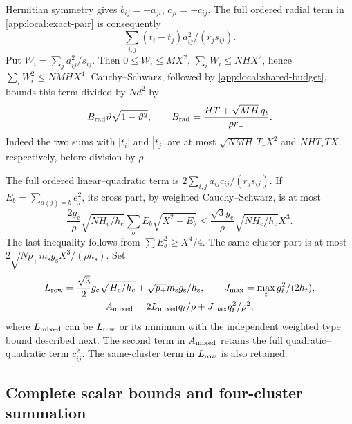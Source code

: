 Hermitian symmetry gives $b_{ij}=-a_{ji}$, $c_{ji}=-c_{ij}$.
The full ordered radial term in \eqref{app:local:exact-pair} is consequently
\[
 \sum_{i,j}(t_i-t_j)a_{ij}^2/(r_js_{ij}).
\]
Put $W_i=\sum_j a_{ij}^2/s_{ij}$. Then $0\le W_i\le MX^2$,
$\sum_iW_i\le NHX^2$, hence $\sum_iW_i^2\le NMHX^4$.
Cauchy--Schwarz, followed by \eqref{app:local:shared-budget}, bounds this
term divided by $Nd^2$ by
\begin{equation}\label{app:local:radial-row}
 B_{\rm rad}\vartheta\sqrt{1-\vartheta^2},\qquad
 B_{\rm rad}=\frac{HT+\sqrt{MH}\,q_t}{\rho r_-}.
\end{equation}
Indeed the two sums with $|t_i|$ and $|t_j|$ are at most
$\sqrt{NMH}\,T_rX^2$ and $NHT_rTX$, respectively, before division by
$\rho$.

The full ordered linear--quadratic term is
$2\sum_{i,j}a_{ij}c_{ij}/(r_js_{ij})$. If
$E_b=\sum_{a(j)=b}e_j^2$, its cross part, by weighted Cauchy--Schwarz,
is at most
\[
 \frac{2g_{\mathrm c}}\rho\sqrt{NH_{\mathrm c}/h_{\mathrm c}}
 \sum_b E_b\sqrt{X^2-E_b}
 \le\frac{\sqrt3g_{\mathrm c}}\rho
        \sqrt{NH_{\mathrm c}/h_{\mathrm c}}X^3.
\]
The last inequality follows from
$\sum E_b^2\ge X^4/4$. The same-cluster part is at most
$2\sqrt{Np_+}m_{\mathrm s}g_{\mathrm s}X^3/(\rho h_{\mathrm s})$.
Set
\begin{gather}
 L_{\rm row}=\frac{\sqrt3}2g_{\mathrm c}\sqrt{H_{\mathrm c}/h_{\mathrm c}}
        +\sqrt{p_+}m_{\mathrm s}g_{\mathrm s}/h_{\mathrm s},\qquad
 J_{\max}=\max_t g_t^2/(2h_t),\nonumber\\
 A_{\rm mixed}=2L_{\rm mixed}q_t/\rho+J_{\max}q_t^2/\rho^2,
 \label{app:local:mixed-row}
\end{gather}
where $L_{\rm mixed}$ can be $L_{\rm row}$ or its minimum with the
independent weighted type bound described next. The second term in
$A_{\rm mixed}$ retains the full quadratic--quadratic term $c_{ij}^2$.
The same-cluster term in $L_{\rm row}$ is also retained.

\subsection{Complete scalar bounds and four-cluster summation}
\label{app:local:scalar-tail}

